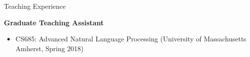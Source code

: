 \documentclass{resume} %
\begin{document}
\begin{rSection}{Teaching Experience}



\textbf{Graduate Teaching Assistant}
\begin{itemize}
\item CS685: Advanced Natural Language Processing (University of Massachusetts Amherst, Spring 2018)
\end{itemize}






\end{rSection}
\end{document}
